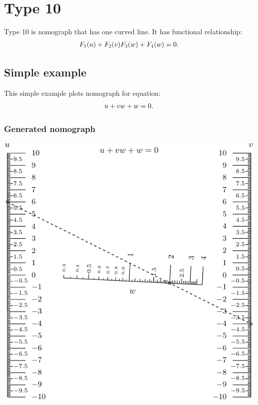 \documentclass[a4paper,11pt,english]{sphinxmanual}
\begin{document}
\section{Type 10}
\label{types/types:type10-ref}\label{types/types:type-10}
Type 10 is nomograph that has one curved line. It has functional relationship:
\begin{gather}
\begin{split}F_1(u)+F_2(v)F_3(w)+F_4(w)=0.\end{split}\notag
\end{gather}

\subsection{Simple example}
\label{types/types:id49}
This simple example plots nomograph for equation:
\begin{gather}
\begin{split}u + v w + w = 0.\end{split}\notag
\end{gather}

\subsubsection{Generated nomograph}
\label{types/types:id50}
\includegraphics{ex_type10_nomo_1.pdf}
\end{document}
